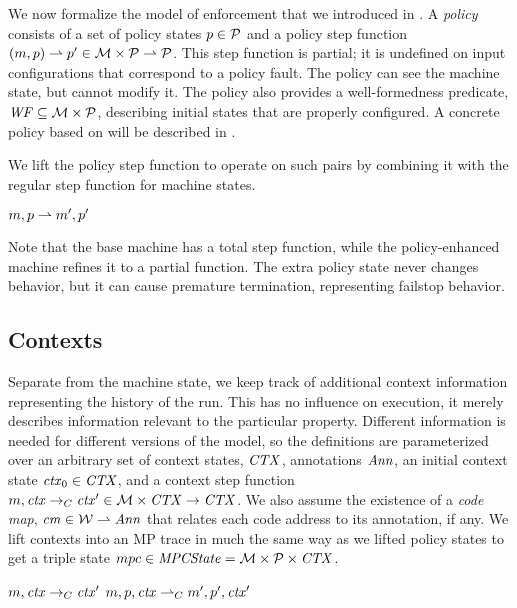 \documentclass[acmsmall,review,anonymous]{acmart}\settopmatter{printfolios=true,printccs=false,printacmref=false}
\begin{document}
We now formalize the model of enforcement that we introduced in .
A {\em policy} consists of a set of policy
states \(p \in \mathcal{P}\) and a policy step function \((m, p) \rightharpoonup p' \in
{\mathcal M} \times \mathcal{P} \rightharpoonup \mathcal{P}\). This step function is partial;
it is undefined on input configurations that correspond to a policy fault. The policy
can see the machine state, but cannot modify it. The policy also provides a
well-formedness predicate, \(\mathit{WF} \subseteq {\mathcal M} \times \mathcal{P}\), describing
initial states that are properly configured.
%
A concrete policy based on \citet{DBLP:conf/sp/RoesslerD18} will be described in
.

We lift the policy step function to operate on such pairs
by combining it with the regular step function for machine states.

            {\(m,p \overset{}{\rightharpoonup}
               m',p'\)}

\noindent
Note that the base machine has a total step function, while the policy-enhanced machine
refines it to a partial function. The extra policy state never changes behavior,
but it can cause
premature termination, representing failstop behavior.

\subsection{Contexts}

Separate from the machine state, we keep track of additional context
information representing the history of the run. This has no influence on execution, it merely
describes information relevant to the particular property. Different information is needed
for different versions of the model, so the definitions are parameterized
over an arbitrary set of context states, \(\mathit{CTX}\), annotations \(\mathit{Ann}\),
an initial context state \(\mathit{ctx}_0 \in \mathit{CTX}\), and a context step function
\(m, \mathit{ctx} \rightarrow_C \mathit{ctx}' \in {\mathcal M} \times \mathit{CTX}
\rightarrow \mathit{CTX}\). We also assume the existence of a \emph{code map},
\(\mathit{cm} \in {\mathcal W} \rightharpoonup \mathit{Ann}\)
that relates each code address to its annotation, if any.
We lift contexts into an MP trace in much the same way as we lifted policy states to get
a triple state \(mpc \in \mathit{MPCState} = {\mathcal M} \times \mathcal{P} \times
\mathit{CTX}\).

              {\(m, \mathit{ctx} \rightarrow_C \mathit{ctx}'\)}
              {\(m,p,\mathit{ctx} \overset{}{\rightharpoonup}_C
                m',p',\mathit{ctx}'\)}
\end{document}
